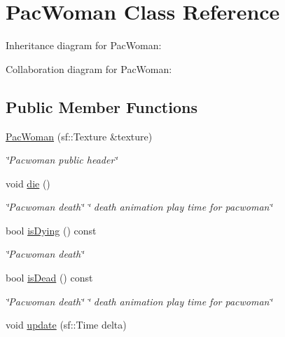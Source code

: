 \hypertarget{classPacWoman}{}\section{Pac\+Woman Class Reference}
\label{classPacWoman}


Inheritance diagram for Pac\+Woman\+:


Collaboration diagram for Pac\+Woman\+:
\subsection*{Public Member Functions}
\begin{DoxyCompactItemize}
\item 
\hyperlink{classPacWoman_a21e0c1f228e09eb07199eac5e2f0ba77}{Pac\+Woman} (sf\+::\+Texture \&texture)
\begin{DoxyCompactList}\small\item\em \char`\"{}\+Pacwoman public header\char`\"{} \end{DoxyCompactList}\item 
\mbox{\label{classPacWoman_a01ee588e34ac3cb29f96c75dd72fa44e}} 
void \hyperlink{classPacWoman_a01ee588e34ac3cb29f96c75dd72fa44e}{die} ()
\begin{DoxyCompactList}\small\item\em \char`\"{}\+Pacwoman death\char`\"{}  \char`\"{} death animation play time for pacwoman\char`\"{} \end{DoxyCompactList}\item 
bool \hyperlink{classPacWoman_acbd14fdccea1d7d02e91327f0a659979}{is\+Dying} () const
\begin{DoxyCompactList}\small\item\em \char`\"{}\+Pacwoman death\char`\"{} \end{DoxyCompactList}\item 
\mbox{\label{classPacWoman_a4bccfb4c24228fcc204e139171e7d221}} 
bool \hyperlink{classPacWoman_a4bccfb4c24228fcc204e139171e7d221}{is\+Dead} () const
\begin{DoxyCompactList}\small\item\em \char`\"{}\+Pacwoman death\char`\"{}  \char`\"{} death animation play time for pacwoman\char`\"{} \end{DoxyCompactList}\item 
void \hyperlink{classPacWoman_a82b822a1b09b749568031b76f62ddae7}{update} (sf\+::\+Time delta)

\end{DoxyCompactItemize}
